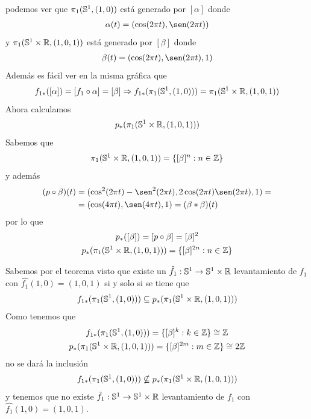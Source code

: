 \begin{ejemplo}
    podemos ver que $\pi_1(\mathbb{S}^1,(1,0))$ está generado por $[\alpha]$ donde 
    \begin{gather*}
        \alpha(t) = (\cos(2\pi t), \sen(2\pi t))
    \end{gather*}
    y $\pi_1(\mathbb{S}^1\times \mathbb{R}, (1,0,1))$ está generado por $[\beta]$ donde 
    \begin{gather*}
        \beta(t) = (\cos(2\pi t), \sen(2\pi t), 1)
    \end{gather*}
    Además es fácil ver en la misma gráfica que
    \begin{gather*}
        f_{1*}([\alpha]) = [f_1 \circ \alpha] = [\beta] \Rightarrow
        f_{1*}(\pi_1(\mathbb{S}^1, (1,0))) = \pi_1(\mathbb{S}^1\times \mathbb{R}, (1,0,1))
    \end{gather*}
    Ahora calculamos
    \begin{gather*}
        p_*(\pi_1(\mathbb{S}^1 \times \mathbb{R}, (1,0,1)))
    \end{gather*}
    Sabemos que 
    \begin{gather*}
        \pi_1(\mathbb{S}^1 \times \mathbb{R}, (1,0,1)) = \{[\beta]^n : n\in \mathbb{Z}\}
    \end{gather*}
    y además
    \begin{align*}
        (p\circ \beta)(t) &= (\cos^2(2\pi t) - \sen^2(2\pi t), 2\cos (2\pi t)\sen(2\pi t), 1) =\\
        &= (\cos(4\pi t), \sen(4\pi t), 1) = (\beta \ast \beta)(t)
    \end{align*}
    por lo que 
    \begin{gather*}
        p_*([\beta]) = [p\circ \beta] = [\beta]^2\\
        p_*(\pi_1(\mathbb{S}^1 \times \mathbb{R}, (1,0,1))) = \{[\beta]^{2n} : n\in \mathbb{Z}\}
    \end{gather*}

    Sabemos por el teorema visto que existe un $\hat{f_1} : \mathbb{S}^1 \to \mathbb{S}^1 \times \mathbb{R}$ levantamiento de $f_1$ con $\hat{f_1}(1,0)=(1,0,1)$ si y solo si se tiene que 
    \begin{gather*}
        f_{1*}(\pi_1(\mathbb{S}^1, (1,0))) \subseteq p_*(\pi_1(\mathbb{S}^1 \times \mathbb{R}, (1,0,1)))
    \end{gather*}
    Como tenemos que 
    \begin{gather*}
        f_{1*}(\pi_1(\mathbb{S}^1, (1,0))) = \{[\beta]^k : k\in \mathbb{Z}\} \cong \mathbb{Z} \\
        p_*(\pi_1(\mathbb{S}^1 \times \mathbb{R}, (1,0,1))) = \{[\beta]^{2m}: m\in \mathbb{Z}\} \cong 2\mathbb{Z}
    \end{gather*}
    no se dará la inclusión 
    \begin{gather*}
        f_{1*}(\pi_1(\mathbb{S}^1, (1,0))) \nsubseteq p_*(\pi_1(\mathbb{S}^1 \times \mathbb{R}, (1,0,1)))
    \end{gather*}
    y tenemos que no existe $\hat{f_1} : \mathbb{S}^1 \to \mathbb{S}^1 \times \mathbb{R}$ levantamiento de $f_1$ con $\hat{f_1}(1,0)=(1,0,1)$.


\end{ejemplo}
